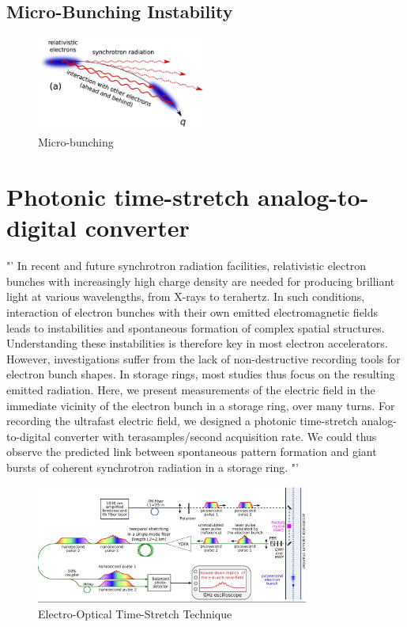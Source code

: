 \subsection{Micro-Bunching Instability}
\begin{figure}[H]
	\centering
	\includegraphics[width = 0.5\textwidth]{chap/02-theory/img/csr.png}
	\caption{Micro-bunching \cite{Bielawski2019}}
	\label{fig:microBunch}
\end{figure}

\newpage 
\section{Photonic time-stretch analog-to-digital converter}

"' In recent and future synchrotron radiation facilities, relativistic electron bunches with increasingly high charge density are needed for producing brilliant light at various wavelengths, from X-rays to terahertz. In such conditions, interaction of electron bunches with their own emitted electromagnetic fields leads to instabilities and spontaneous formation of complex spatial structures. Understanding these instabilities is therefore key in most electron accelerators. However, investigations suffer from the lack of non-destructive recording tools for electron bunch shapes. In storage rings, most studies thus focus on the resulting emitted radiation. Here, we present measurements of the electric field in the immediate vicinity of the electron bunch in a storage ring, over many turns. For recording the ultrafast electric field, we designed a photonic time-stretch analog-to-digital converter with terasamples/second acquisition rate. We could thus observe the predicted link between spontaneous pattern formation and giant bursts of coherent synchrotron radiation in a storage ring. "'  \cite{Bielawski2019}

\begin{figure}[H]
	\centering
	\includegraphics[width = 0.8\textwidth]{chap/02-theory/img/EO.png}
	\caption{Electro-Optical Time-Stretch Technique \cite{Bielawski2019}}
	\label{fig:eo}
\end{figure}


